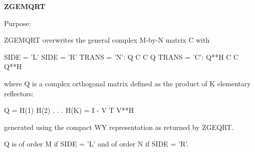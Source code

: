 {\bfseries Z\+G\+E\+M\+Q\+R\+T} 

 \begin{DoxyParagraph}{Purpose\+: }
\begin{DoxyVerb} ZGEMQRT overwrites the general complex M-by-N matrix C with

                 SIDE = 'L'     SIDE = 'R'
 TRANS = 'N':      Q C            C Q
 TRANS = 'C':    Q**H C            C Q**H

 where Q is a complex orthogonal matrix defined as the product of K
 elementary reflectors:

       Q = H(1) H(2) . . . H(K) = I - V T V**H

 generated using the compact WY representation as returned by ZGEQRT. 

 Q is of order M if SIDE = 'L' and of order N  if SIDE = 'R'.\end{DoxyVerb}
 
\end{DoxyParagraph}

